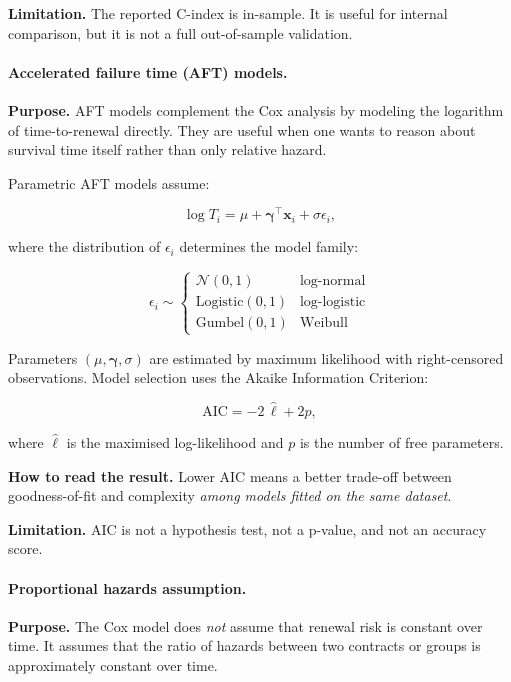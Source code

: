 \documentclass[12pt, a4paper]{article}
\begin{document}
\textbf{Limitation.} The reported C-index is in-sample. It is useful for
internal comparison, but it is not a full out-of-sample validation.

\paragraph{Accelerated failure time (AFT) models.}
\textbf{Purpose.} AFT models complement the Cox analysis by modeling the
logarithm of time-to-renewal directly. They are useful when one wants to reason
about survival time itself rather than only relative hazard.

Parametric AFT models assume:

\begin{equation}
  \log T_i = \mu + \boldsymbol{\gamma}^\top \mathbf{x}_i + \sigma \epsilon_i,
\end{equation}

where the distribution of $\epsilon_i$ determines the model family:

\begin{equation}
  \epsilon_i \sim
  \begin{cases}
    \mathcal{N}(0,1)  & \text{log-normal} \\
    \text{Logistic}(0,1) & \text{log-logistic} \\
    \text{Gumbel}(0,1) & \text{Weibull}
  \end{cases}
\end{equation}

Parameters $(\mu, \boldsymbol{\gamma}, \sigma)$ are estimated by maximum
likelihood with right-censored observations. Model selection uses the
Akaike Information Criterion:

\begin{equation}
  \mathrm{AIC} = -2\,\hat{\ell} + 2p,
\end{equation}

where $\hat{\ell}$ is the maximised log-likelihood and $p$ is the number of
free parameters.

\textbf{How to read the result.} Lower AIC means a better trade-off between
goodness-of-fit and complexity \emph{among models fitted on the same dataset}.

\textbf{Limitation.} AIC is not a hypothesis test, not a p-value, and not an
accuracy score.

\paragraph{Proportional hazards assumption.}
\textbf{Purpose.} The Cox model does \emph{not} assume that renewal risk is
constant over time. It assumes that the ratio of hazards between two contracts
or groups is approximately constant over time.
\end{document}
